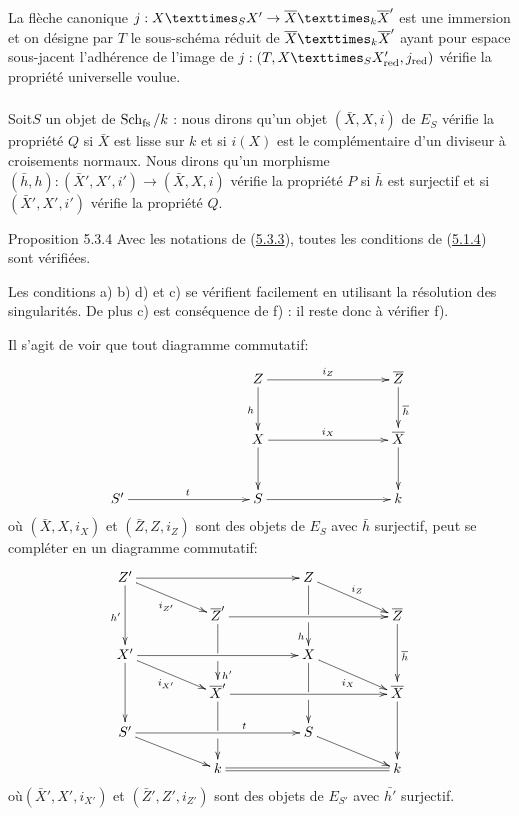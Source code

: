 \documentclass[10pt]{../fichiers-configuration-latex/smfart}
\begin{document}
La flèche canonique $j : \fprod{X}{X'}{S} \to
\fprod{\bar{X}}{\bar{X}'}{k}$ est une immersion et on désigne par $T$
le sous-schéma réduit de $\fprod{\bar{X}}{\bar{X}'}{k}$ ayant pour
espace sous-jacent l'adhérence de l'image de $j : (T,
{\fprod{X}{X'_{\red}}{S}}, j_{\red})$ vérifie la propriété universelle voulue.

\setcounter{subsubsection}{2}
\subsubsection{}
Soit\pageoriginale $S$ un objet de $\operatorname{Sch}_{\operatorname{fs}} /k$ : nous dirons qu'un objet
$(\bar{X}, X, i)$ de $E_S$ vérifie la propriété $Q$ si $\bar{X}$ est
lisse sur $k$ et si $i(X)$ est le complémentaire d'un diviseur à
croisements normaux. Nous dirons qu'un morphisme
$(\bar{h}, h) : (\bar{X}', X', i') \to (\bar{X}, X, i)$ vérifie la
propriété $P$ si $\bar{h}$ est surjectif et si $(\bar{X}', X', i')$
vérifie la propriété $Q$.

\begin{enonce*}{Proposition 5.3.4}
Avec les notations de (\hyperref[Vbis.subsubsec5.3.3]{5.3.3}), toutes les conditions de
(\hyperref[Vbis.subsubsec5.1.4]{5.1.4}) sont vérifiées.
\end{enonce*}

Les conditions a) b) d) et c) se vérifient facilement en utilisant la
résolution des singularités. De plus c) est conséquence de f) : il
reste donc à vérifier f).

Il s'agit de voir que tout diagramme commutatif:
\[
\xymatrix@C=3cm@R=1cm{
              &Z         \ar[r]^{i_Z} \ar[d]_{h}& \bar{Z}\ar[d]^{\bar{h}}\\
              &X \ar[r]^{i_X} \ar[d]& \bar{X}\ar[d]\\
 S'\ar[r]^{t} &S  \ar[r]            & k
}
\]
où $(\bar{X}, X, i_X)$ et $(\bar{Z}, Z, i_Z)$ sont des objets de $E_S$
avec $\bar{h}$ surjectif, peut se compléter en un diagramme
commutatif:
\[
\xymatrix@C=1.7cm@R=.45cm{
Z' \ar[rr] \ar[rd]_{i_{Z'}} \ar[dd]_{h'}&    & Z \ar[rd]^{i_Z} \ar@{->} '[d][dd]_{h} &\\
         & \bar{Z}' \ar[rr] \ar@{->} '[d][dd]^{h'}&    & \bar{Z}\ar[dd]^{\bar{h}}\\
X'  \ar[rr] \ar[dd]\ar[rd]_{i_{X'}}   &    & X \ar[rd]_{i_X} \ar@{->} '[d][dd]&\\
         & \bar{X}'  \ar@{->} '[d][dd] \ar[rr]&    & \bar{X} \ar[dd]\\
S'\ar[rr]^(.65){t}\ar[rd]        &    & S \ar[rd] &\\
         & k  \ar@{=}[rr]&    & k
}
\]
où\pageoriginale $(\bar{X}', X', i_{X'})$ et $(\bar{Z}', Z', i_{Z'})$ sont des objets de $E_{S'}$
avec $\bar{h'}$ surjectif.
\end{document}
